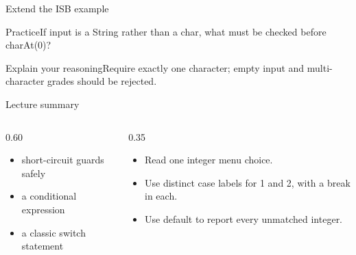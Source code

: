\documentclass[10pt,aspectratio=169]{beamer}
\begin{document}
\begin{frame}[fragile,t]{Extend the ISB example}
\begin{alertblock}{Practice}If input is a String rather than a char, what must be checked before charAt(0)?\end{alertblock}\vspace{3mm}\begin{exampleblock}{Explain your reasoning}Require exactly one character; empty input and multi{-}character grades should be rejected.\end{exampleblock}
\end{frame}
\begin{frame}[fragile,t]{Lecture summary}
\begin{columns}[T,onlytextwidth]\begin{column}{0.60\textwidth}
\begin{itemize}
\item short-circuit guards safely
\item a conditional expression
\item a classic switch statement
\end{itemize}
\end{column}\begin{column}{0.35\textwidth}\small
\begin{itemize}
\item Read one integer menu choice.
\item Use distinct case labels for 1 and 2, with a break in each.
\item Use default to report every unmatched integer.
\end{itemize}
\end{column}\end{columns}
\end{frame}
\end{document}
